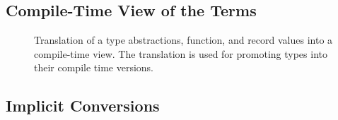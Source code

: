 \subsection{Compile-Time View of the Terms}
\label{sct:compile-views}
\begin{figure}
\begin{multicols}{2}[]

    {\Pi \tsv {}}

    {\Pi \tsv {}}

\end{multicols}
\vspace{4pt}

    {\Pi \tsv {}}

    {\Pi \tsv {}}

    {\Pi \tsv {}}

    {\Pi \tsv {}}

    {\Pi \tsv {}}

    {\Pi \tsv {}}

    {\Pi \tsv {}}

\caption{Translation of a type abstractions, function, and record values into a compile-time view. The translation
 is used for promoting types into their compile time versions.}
\label{fig:ct-translation}
\end{figure}

\subsection{Implicit Conversions}
\label{sct:conversions}

